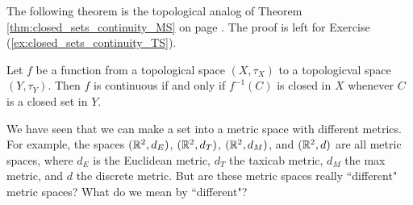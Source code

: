 \begin{comment}

\ActivitySolution

\ba

\item To show that $f$ is continuous we will prove that $f^{-1}(N)$ is a neighborhood of $a \in X$ whenever $N$ is a neighborhood of $f(a)$ in $Y$. 

\item Let $a \in X$ and let $N$ be a neighborhood of $f(a)$ in $Y$. Then $N$ contains an open set $O$ with $f(a) \in O$. 

\item By our hypothesis, we can conclude that $f^{-1}(O)$ is open in $X$. But if $x \in f^{-1}(O)$, then $f(x) \in O \subseteq N$. So $f^{-1}(O) \subseteq f^{-1}(N)$ and so $f^{-1}(N)$ is a neighborhood of $a$ in $X$. 

\item Since $a$ was chosen arbitrarily in $X$, we can conclude that $f^{-1}(N)$ is a neighborhood of $a$ in $X$ whenever $N$ is a neighborhood of $f(a)$ in $Y$. Therefore, $f$ is a continuous function.

\ea

\end{comment}

The following theorem is the topological analog of Theorem \ref{thm:closed_sets_continuity_MS} on page \pageref{thm:closed_sets_continuity_MS}. The proof is left for Exercise (\ref{ex:closed_sets_continuity_TS}).

\begin{theorem} \label{thm:closed_sets_continuity_TS} Let $f$ be a function from a topological space $(X,\tau_X)$ to a topologicval space $(Y,\tau_Y)$. Then $f$ is continuous if and only if $f^{-1}(C)$ is closed in $X$ whenever $C$ is a closed set in $Y$.  
\end{theorem}

\label{sec_metric_equiv}

We have seen that we can make a set into a metric space with different metrics. For example, the spaces $(\mathbb{R}^2, d_E)$, $(\mathbb{R}^2, d_T)$, $(\mathbb{R}^2, d_M)$, and $(\mathbb{R}^2, d)$ are all metric spaces, where $d_E$ is the Euclidean metric, $d_T$ the taxicab metric, $d_M$ the max metric, and $d$ the discrete metric. But are these metric spaces really ``different" metric spaces? What do we mean by ``different"? 

